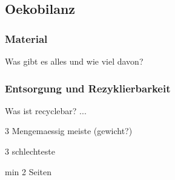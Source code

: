 \subsection{Oekobilanz}

\subsubsection{Material}

Was gibt es alles und wie viel davon?
\subsubsection{Entsorgung und Rezyklierbarkeit}
Was ist recyclebar? ...


3 Mengemaessig meiste (gewicht?)

3 schlechteste

min 2 Seiten
